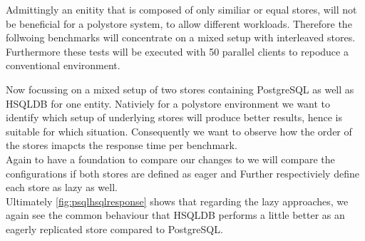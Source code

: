 Admittingly an enitity that is composed of only similiar or equal stores, will not be beneficial for a polystore system, to allow different workloads.
Therefore the follwoing benchmarks will concentrate on a mixed setup with interleaved stores. Furthermore these tests will be executed with 50 parallel clients to repoduce a 
conventional environment. 



Now focussing on a mixed setup of two stores containing PostgreSQL as well as HSQLDB for one entity.
Nativiely for a polystore environment we want to identify which setup of underlying stores will produce better results, hence is suitable for which situation.
Consequently we want to observe how the order of the stores imapcts the response time per benchmark.\\
Again to have a foundation to compare our changes to we will compare the configurations if both stores are defined as eager and Further
respectiviely define each store as lazy as well.\\
Ultimately \ref{fig:psqlhsqlresponse} shows that regarding the lazy approaches, we again see the common behaviour that HSQLDB performs a little better as an eagerly replicated
store compared to PostgreSQL.


